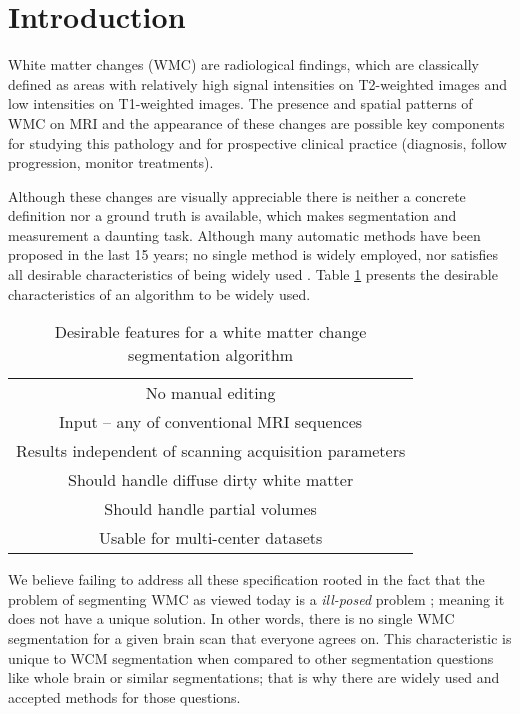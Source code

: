 \section{Introduction} \label{intro}


White matter changes (WMC) are radiological findings, which are classically defined as areas with relatively high signal intensities on T2-weighted images and low intensities on T1-weighted images. The presence and spatial patterns of WMC on MRI and the appearance of these changes are possible key components for studying this pathology and for prospective clinical practice (diagnosis, follow progression, monitor treatments).

Although these changes are visually appreciable there is neither a concrete definition nor a ground truth is available, which makes segmentation and measurement a daunting task. Although many automatic methods have been proposed in the last 15 years; no single method is widely employed, nor satisfies all desirable characteristics of being widely used \cite{GarciaReview}. Table \ref{Table:Requirements} presents the desirable characteristics of an algorithm to be widely used.

\begin{table}
\centering
    \begin{tabular}  {  c }
    \hline
        No manual editing \\ 
        Input – any of conventional MRI sequences \\ 
        Results independent of scanning acquisition parameters \\ 
        Should handle diffuse dirty white matter \\ 
        Should handle partial volumes \\ 
        Usable for multi-center datasets \\
    \hline
    \end{tabular} 
    \caption{Desirable features for a white matter change segmentation algorithm } 
    \label{Table:Requirements}
\end{table}
    
We believe failing to address all these specification rooted in the fact that the problem of segmenting WMC as viewed today is a \textit{ill-posed} problem \cite{IllPosed}; meaning it does not have a unique solution. In other words, there is no single WMC segmentation for a given brain scan that everyone agrees on. This characteristic is unique to WCM segmentation when compared to other segmentation questions like whole brain or similar segmentations; that is why there are widely used and accepted methods for those questions.

